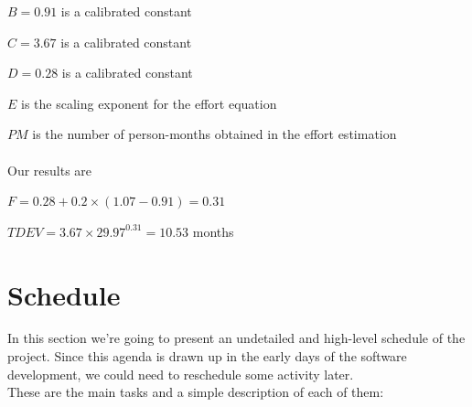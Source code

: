 \documentclass[english]{article}
\begin{document}
$B = 0.91$ is a calibrated constant

$C = 3.67$ is a calibrated constant

$D = 0.28$ is a calibrated constant

$E$ is the scaling exponent for the effort equation

$PM$ is the number of person-months obtained in the effort estimation
\paragraph{}
Our results are
\begin{center}
$F = 0.28 + 0.2 \times (1.07 - 0.91) = 0.31$
\end{center}

\begin{center}
$TDEV = 3.67 \times 29.97^{0.31} = 10.53$ months
\end{center}

\newpage
\section{Schedule}

In this section we're going to present an undetailed and high-level schedule of the project. Since this agenda is drawn up in the early days of the software development, we could need to reschedule some activity later.\\
These are the main tasks and a simple description of each of them:
\end{document}
